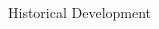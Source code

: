 \documentclass[final,cmyk]{beamer}
\begin{document}
\begin{frame}[t]
\begin{minipage}[t][.3\textheight][t]{\textwidth}
\begin{columns}
\begin{column}{.6\textwidth}
\begin{block}{Historical Development}
		  \end{block}
		\end{column}

		\begin{column}{.3\textwidth}

		\end{column}

\end{columns}
\end{minipage}

\end{frame} %
\end{document}

